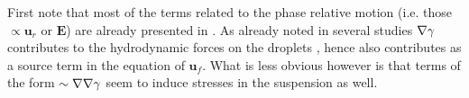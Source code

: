 First note that most of the terms related to the phase relative motion (i.e. those $\propto \textbf{u}_r$ or $\textbf{E}$) are already presented in \citet[Appendix A]{zhang1997momentum}. 
As already noted in several studies $\mathbf{\nabla} \gamma$ contributes to the hydrodynamic forces on the droplets \citep{Subramanian_1985}, hence also contributes as a source term in the equation of $\textbf{u}_f$. 
What is less obvious however is that terms of the form $\sim \mathbf{\nabla}\mathbf{\nabla}\gamma$ seem to induce stresses in the suspension as well.


